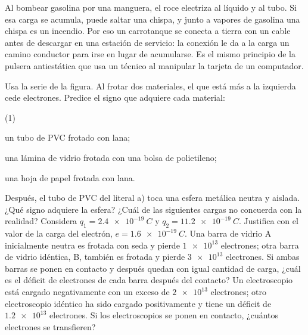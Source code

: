 \documentclass[11pt]{article}
\begin{document}
\begin{aplicacion}
Al bombear gasolina por una manguera, el roce electriza al líquido y al tubo.
Si esa carga se acumula, puede saltar una chispa, y junto a vapores de
gasolina una chispa es un incendio. Por eso un carrotanque se conecta a tierra
con un cable antes de descargar en una estación de servicio: la conexión le da
a la carga un camino conductor para irse en lugar de acumularse. Es el mismo
principio de la pulsera antiestática que usa un técnico al manipular la
tarjeta de un computador.
\end{aplicacion}

\begin{preguntas}
\pregunta Usa la serie de la figura. Al frotar dos materiales, el que está más
a la izquierda cede electrones. Predice el signo que adquiere cada material:
\begin{opciones*}(1)
  \item un tubo de PVC frotado con lana;
  \item una lámina de vidrio frotada con una bolsa de polietileno;
  \item una hoja de papel frotada con lana.
\end{opciones*}
Después, el tubo de PVC del literal a) toca una esfera metálica neutra y
aislada. ¿Qué signo adquiere la esfera?
\espacio{3cm}
\pregunta ¿Cuál de las siguientes cargas no concuerda con la realidad?
Considera $q_1 = \qty{2,4e-19}{C}$ y $q_2 = \qty{11,2e-19}{C}$. Justifica con
el valor de la carga del electrón, $e = \qty{1,6e-19}{C}$.
\espacio{3cm}
\pregunta Una barra de vidrio A inicialmente neutra es frotada con seda y
pierde $\num{1e13}$ electrones; otra barra de vidrio idéntica, B, también es
frotada y pierde $\num{3e13}$ electrones. Si ambas barras se ponen en contacto
y después quedan con igual cantidad de carga, ¿cuál es el déficit de
electrones de cada barra después del contacto?
\espacio{3cm}
\pregunta Un electroscopio está cargado negativamente con un exceso de
$\num{2e13}$ electrones; otro electroscopio idéntico ha sido cargado
positivamente y tiene un déficit de $\num{1,2e13}$ electrones. Si los
electroscopios se ponen en contacto, ¿cuántos electrones se transfieren?
\espacio{3cm}
\end{preguntas}
\end{document}
